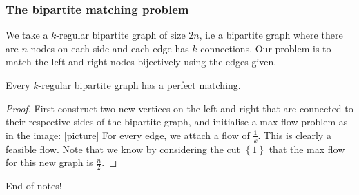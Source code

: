 \documentclass[egregdoesnotlikesansseriftitles,a4paper]{scrartcl}
\begin{document}
\subsubsection{The bipartite matching problem}
We take a $k$-regular bipartite graph of size $2n$, i.e a bipartite graph where there are $n$ nodes on each side and each edge has $k$ connections. Our problem is to match the left and right nodes bijectively using the edges given.
\begin{theorem}
	Every $k$-regular bipartite graph has a perfect matching.
\end{theorem}
\begin{proof}
	 First construct two new vertices on the left and right that are connected to their respective sides of the bipartite graph, and initialise a max-flow problem as in the image: [picture]
	 For every edge, we attach a flow of $\frac{1}{k}$. This is clearly a feasible flow. Note that we know by considering the cut $\left\{1\right\}$ that the max flow for this new graph is $\frac{n}{2}$. 
\end{proof}
\begin{remark}
	 End of notes!
\end{remark}
\end{document}
